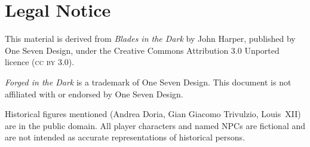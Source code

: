 \documentclass[11pt, a4paper, twoside]{book}
\begin{document}


\frontmatter
\tableofcontents

\mainmatter









\backmatter
\printindex

\chapter*{Legal Notice}

This material is derived from \textit{Blades in the Dark} by John Harper,
published by One Seven Design, under the Creative Commons Attribution
3.0 Unported licence (\textsc{cc by 3.0}).

\textit{Forged in the Dark} is a trademark of One Seven Design.
This document is not affiliated with or endorsed by One Seven Design.

Historical figures mentioned (Andrea Doria, Gian Giacomo Trivulzio,
Louis~XII) are in the public domain. All player characters and named NPCs
are fictional and are not intended as accurate representations of
historical persons.
\end{document}
